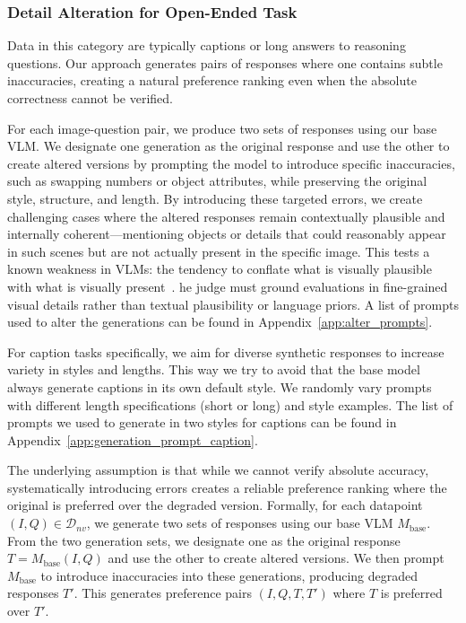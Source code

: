 \subsubsection{Detail Alteration for Open-Ended Task}

Data in this category are typically captions or long answers to reasoning questions. Our approach generates pairs of responses where one contains subtle inaccuracies, creating a natural preference ranking even when the absolute correctness cannot be verified.

For each image-question pair, we produce two sets of responses using our base VLM. We designate one generation as the original response and use the other to create altered versions by prompting the model to introduce specific inaccuracies, such as swapping numbers or object attributes, while preserving the original style, structure, and length. By introducing these targeted errors, we create challenging cases where the altered responses remain contextually plausible and internally coherent—mentioning objects or details that could reasonably appear in such scenes but are not actually present in the specific image. This tests a known weakness in VLMs: the tendency to conflate what is visually plausible with what is visually present~\citep{liu2024mitigatinghallucinationlargemultimodal,povid}. he judge must ground evaluations in fine-grained visual details rather than textual plausibility or language priors. A list of prompts used to alter the generations can be found in Appendix~\ref{app:alter_prompts}.

For caption tasks specifically, we aim for diverse synthetic responses to increase variety in styles and lengths. This way we try to avoid that the base model always generate captions in its own default style. We randomly vary prompts with different length specifications (short or long) and style examples. The list of prompts we used to generate in two styles for captions can be found in Appendix~\ref{app:generation_prompt_caption}. 

The underlying assumption is that while we cannot verify absolute accuracy, systematically introducing errors creates a reliable preference ranking where the original is preferred over the degraded version. Formally, for each datapoint $(I, Q) \in \mathcal{D}_{nv}$, we generate two sets of responses using our base VLM $M_{\text{base}}$. From the two generation sets, we designate one as the original response $T = M_{\text{base}}(I, Q)$ and use the other to create altered versions. We then prompt $M_{\text{base}}$ to introduce inaccuracies into these generations, producing degraded responses $T'$. This generates preference pairs $(I, Q, T, T')$ where $T$ is preferred over $T'$.


